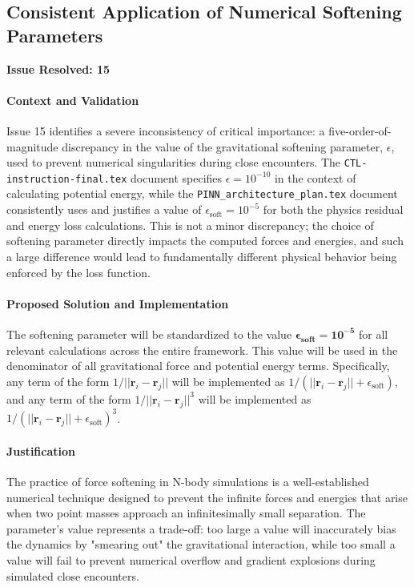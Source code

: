 \subsection{Consistent Application of Numerical Softening Parameters}
\textbf{Issue Resolved: 15}
\paragraph{Context and Validation}
Issue 15 identifies a severe inconsistency of critical importance: a five-order-of-magnitude discrepancy in the value of the gravitational softening parameter, $\epsilon$, used to prevent numerical singularities during close encounters. The \texttt{CTL-instruction-final.tex} document specifies $\epsilon = 10^{-10}$ in the context of calculating potential energy, while the \texttt{PINN\_\allowbreak architecture\_\allowbreak plan.tex} document consistently uses and justifies a value of $\epsilon_{\text{soft}} = 10^{-5}$ for both the physics residual and energy loss calculations. This is not a minor discrepancy; the choice of softening parameter directly impacts the computed forces and energies, and such a large difference would lead to fundamentally different physical behavior being enforced by the loss function.

\paragraph{Proposed Solution and Implementation}
The softening parameter will be standardized to the value $\boldsymbol{\epsilon_{\text{soft}} = 10^{-5}}$ for all relevant calculations across the entire framework. This value will be used in the denominator of all gravitational force and potential energy terms. Specifically, any term of the form $1/||\mathbf{r}_i - \mathbf{r}_j||$ will be implemented as $1/(||\mathbf{r}_i - \mathbf{r}_j|| + \epsilon_{\text{soft}})$, and any term of the form $1/||\mathbf{r}_i - \mathbf{r}_j||^3$ will be implemented as $1/(||\mathbf{r}_i - \mathbf{r}_j|| + \epsilon_{\text{soft}})^3$.

\paragraph{Justification}
The practice of force softening in N-body simulations is a well-established numerical technique designed to prevent the infinite forces and energies that arise when two point masses approach an infinitesimally small separation. The parameter's value represents a trade-off: too large a value will inaccurately bias the dynamics by "smearing out" the gravitational interaction, while too small a value will fail to prevent numerical overflow and gradient explosions during simulated close encounters.

